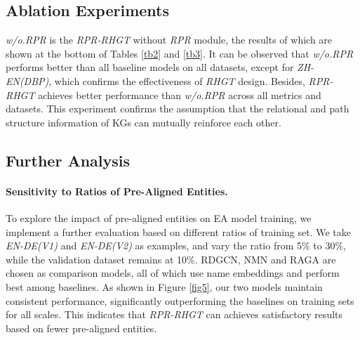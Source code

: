 \documentclass{article}
\begin{document}


\subsection{Ablation Experiments}
\textit{w/o.RPR} is the \textit{RPR-RHGT} without \textit{RPR} module, the results of which are shown at the bottom of Tables \ref{tb2} and \ref{tb3}.
It can be observed that \textit{w/o.RPR} performs better than all baseline models on all datasets, except for \textit{ZH-EN(DBP)}, which confirms the effectiveness of \textit{RHGT} design. 
%
Besides, \textit{RPR-RHGT} achieves better performance than \textit{w/o.RPR} across all metrics and datasets.
This experiment confirms the assumption that the relational and path structure information of KGs can mutually reinforce each other.


\subsection{Further Analysis}

\paragraph{Sensitivity to Ratios of Pre-Aligned Entities.}
To explore the impact of pre-aligned entities on EA model training, we implement a further evaluation based on different ratios of training set.
We take \textit{EN-DE(V1)} and \textit{EN-DE(V2)} as examples, and vary the ratio from 5\% to 30\%, while the validation dataset remains at 10\%.
RDGCN, NMN and RAGA are chosen as comparison models, all of which use name embeddings and perform best among baselines.
As shown in Figure \ref{fig5}, our two models maintain consistent performance, significantly outperforming the baselines on training sets for all scales.
This indicates that \textit{RPR-RHGT} can achieves satisfactory results based on fewer pre-aligned entities.
\end{document}
